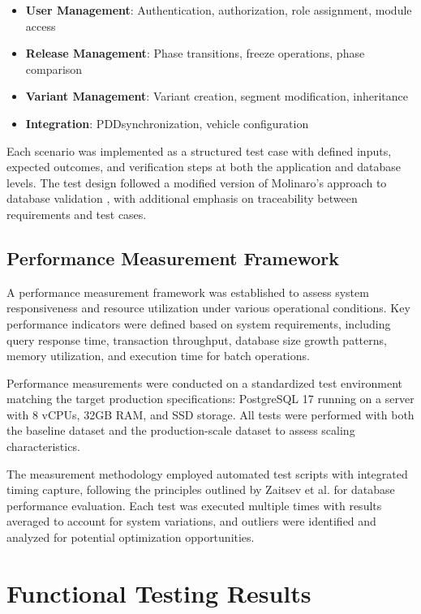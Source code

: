 \begin{itemize}
\item \textbf{User Management}: Authentication, authorization, role assignment, module access
\item \textbf{Release Management}: Phase transitions, freeze operations, phase comparison
\item \textbf{Variant Management}: Variant creation, segment modification, inheritance
\item \textbf{Integration}: \ac{PDD}synchronization, vehicle configuration
\end{itemize}

Each scenario was implemented as a structured test case with defined inputs, expected outcomes, and verification steps at both the application and database levels. The test design followed a modified version of Molinaro's approach to database validation \cite{molinaro2005sql}, with additional emphasis on traceability between requirements and test cases.

\subsection{Performance Measurement Framework}
\label{subsec:performance-measurement-framework}

A performance measurement framework was established to assess system responsiveness and resource utilization under various operational conditions. Key performance indicators were defined based on system requirements, including query response time, transaction throughput, database size growth patterns, memory utilization, and execution time for batch operations. 

Performance measurements were conducted on a standardized test environment matching the target production specifications: PostgreSQL 17 running on a server with 8 vCPUs, 32GB RAM, and SSD storage. All tests were performed with both the baseline dataset and the production-scale dataset to assess scaling characteristics.

The measurement methodology employed automated test scripts with integrated timing capture, following the principles outlined by Zaitsev et al. \cite{schwartz2012high} for database performance evaluation. Each test was executed multiple times with results averaged to account for system variations, and outliers were identified and analyzed for potential optimization opportunities.

\section{Functional Testing Results}
\label{sec:functional-testing-results}

